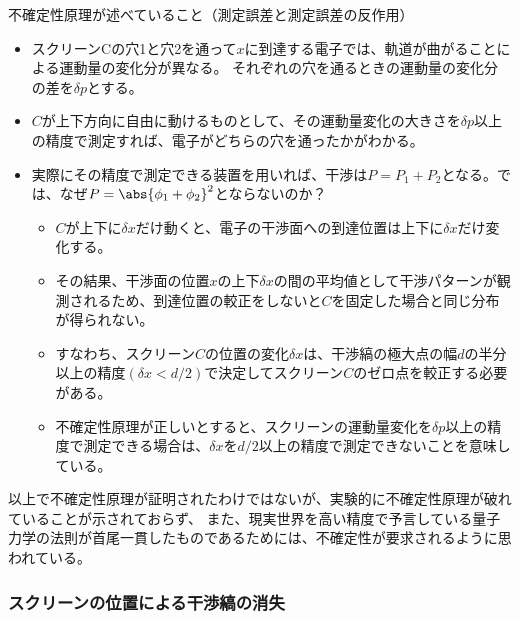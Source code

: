 \documentclass[10pt,aspectratio=169,xcolor=dvipsnames,table,dvipdfmx]{beamer}
\begin{document}
\begin{frame}{不確定性原理が述べていること（測定誤差と測定誤差の反作用）}
    \begin{itemize}
      \item スクリーンCの穴1と穴2を通って$x$に到達する電子では、軌道が曲がることによる運動量の変化分が異なる。
      それぞれの穴を通るときの運動量の変化分の差を$\delta p$とする。
      \item $C$が上下方向に自由に動けるものとして、その運動量変化の大きさを$\delta p$以上の精度で測定すれば、電子がどちらの穴を通ったかがわかる。
      \item 実際にその精度で測定できる装置を用いれば、干渉は$P=P_1+P_2$となる。では、なぜ$P=\abs{\phi_1+\phi_2}^2$とならないのか？
      \begin{itemize}
      \item $C$が上下に$\delta x$だけ動くと、電子の干渉面への到達位置は上下に$\delta x$だけ変化する。
      \item その結果、干渉面の位置$x$の上下$\delta x$の間の平均値として干渉パターンが観測されるため、到達位置の較正をしないと$C$を固定した場合と同じ分布が得られない。
      \item すなわち、スクリーン$C$の位置の変化$\delta x$は、干渉縞の極大点の幅$d$の半分以上の精度$(\delta x <d/2)$で決定してスクリーン$C$のゼロ点を較正する必要がある。
      \item 不確定性原理が正しいとすると、スクリーンの運動量変化を$\delta p$以上の精度で測定できる場合は、$\delta x$を$d/2$以上の精度で測定できないことを意味している。
      \end{itemize}
    \end{itemize}
  以上で不確定性原理が証明されたわけではないが、実験的に不確定性原理が破れていることが示されておらず、
  また、現実世界を高い精度で予言している量子力学の法則が首尾一貫したものであるためには、不確定性が要求されるように思われている。
\end{frame}

\begin{frame}
  \frametitle{スクリーンの位置による干渉縞の消失}
\begin{center}
\end{center}
\end{frame}
\end{document}
